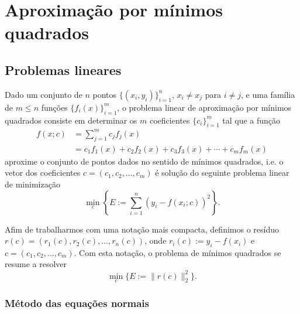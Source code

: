 
\chapter{Aproximação por mínimos quadrados}\label{c_ajuste}
\thispagestyle{fancy}

\section{Problemas lineares}\label{c_ajuste_s_prob_lin}

Dado um conjunto de $n$ pontos $\{(x_i,y_i)\}_{i=1}^n$, $x_i\neq x_j$ para $i\neq j$, e uma família de $m \leq n$ funções $\{f_i(x)\}_{i=1}^m$, o problema linear de aproximação por mínimos quadrados consiste em determinar os $m$ coeficientes $\{c_i\}_{i=1}^m$ tal que a função
\begin{align}    
  f(x;c) &= \sum_{j=1}^m c_jf_j(x) \\
         &= c_1f_1(x) + c_2f_2(x) + c_3f_3(x) + \cdots + c_mf_m(x)
\end{align}
aproxime o conjunto de pontos dados no sentido de mínimos quadrados, i.e. o vetor dos coeficientes $c = (c_1, c_2, \dotsc, c_m)$ é solução do seguinte problema linear de minimização
\begin{equation}
  \min_{c} \left\{E:= \sum_{i=1}^n (y_i - f(x_i;c))^2\right\}.
\end{equation}

Afim de trabalharmos com uma notação mais compacta, definimos o resíduo $r(c) = (r_1(c), r_2(c), \dotsc, r_n(c))$, onde $r_i(c) := y_i - f(x_i)$ e $c = (c_1, c_2, \dotsc, c_m)$. Com esta notação, o problema de mínimos quadrados se resume a resolver
\begin{equation}\label{eq:pmq}
  \min_{c} \{E := \|r(c)\|_2^2\}.
\end{equation}

\subsection{Método das equações normais}

